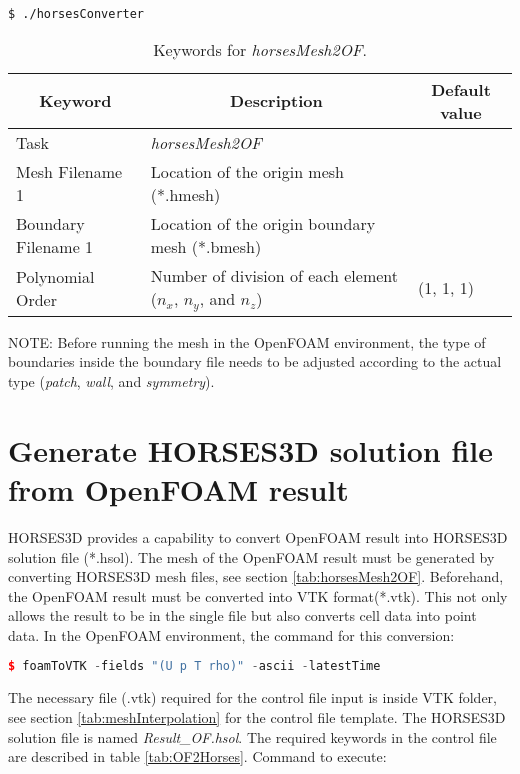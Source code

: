 \documentclass[a4paper,10pt]{report}
\begin{document}
\begin{lstlisting}[language=bash]
	$ ./horsesConverter
\end{lstlisting}

\begin{longtable}{|p{4cm}|p{10cm}|p{2.2cm}|}
\caption{Keywords for \textit{horsesMesh2OF}.} \label{tab:horsesMesh2of} \\
\hline
\multicolumn{1}{|c|}{\textbf{Keyword}} & \multicolumn{1}{c|}{\textbf{Description}} & \multicolumn{1}{c|}{\textbf{Default value}} \\ \hline
\endfirsthead

Task 	        		& \textit{horsesMesh2OF} 						&  \\ \hline
Mesh Filename 1 		& Location of the origin mesh (*.hmesh) 	&  \\ \hline
Boundary Filename 1 	& Location of the origin boundary mesh (*.bmesh) 	&  \\ \hline
Polynomial Order 	& Number of division of each element ($n_x$, $n_y$, and $n_z$) 	& (1, 1, 1) \\ \hline
\end{longtable}

NOTE: Before running the mesh in the OpenFOAM environment, the type of boundaries inside the boundary file needs to be adjusted according to the actual type (\textit{patch}, \textit{wall}, and \textit{symmetry}).

\section{Generate HORSES3D solution file from OpenFOAM result}
HORSES3D provides a capability to convert OpenFOAM result into HORSES3D solution file (*.hsol). The mesh of the OpenFOAM result must be generated by converting HORSES3D mesh files, see section \ref{tab:horsesMesh2OF}. Beforehand, the OpenFOAM result must be converted into VTK format(*.vtk). This not only  allows the result to be in the single file but also converts cell data into point data. In the OpenFOAM environment, the command for this conversion:  
\begin{lstlisting}[language=c++]
	$ foamToVTK -fields "(U p T rho)" -ascii -latestTime
\end{lstlisting}
The necessary file (.vtk) required for the control file input is inside VTK folder, see section \ref{tab:meshInterpolation} for the control file template. The HORSES3D solution file is named \emph{Result\_OF.hsol}. The required keywords in the control file are described in table \ref{tab:OF2Horses}. Command to execute:
\end{document}
